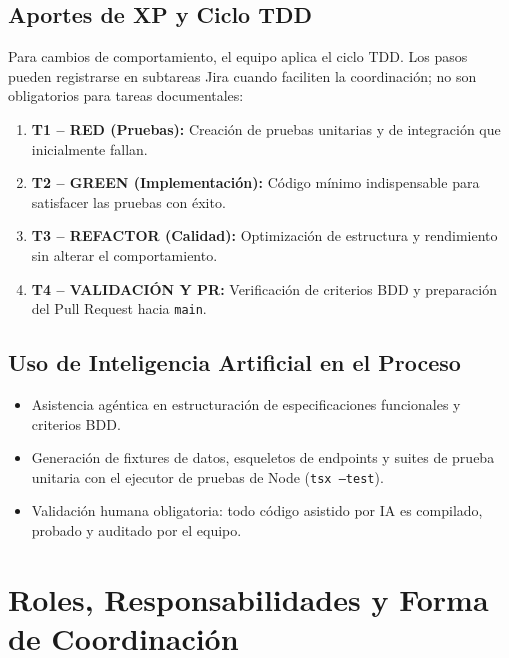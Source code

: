 \documentclass[11pt,a4paper]{article}
\begin{document}
\subsection{Aportes de XP y Ciclo TDD}
Para cambios de comportamiento, el equipo aplica el ciclo TDD. Los pasos pueden registrarse en subtareas Jira cuando faciliten la coordinación; no son obligatorios para tareas documentales:
\begin{enumerate}[leftmargin=*]
    \item \textbf{T1 -- RED (Pruebas):} Creación de pruebas unitarias y de integración que inicialmente fallan.
    \item \textbf{T2 -- GREEN (Implementación):} Código mínimo indispensable para satisfacer las pruebas con éxito.
    \item \textbf{T3 -- REFACTOR (Calidad):} Optimización de estructura y rendimiento sin alterar el comportamiento.
    \item \textbf{T4 -- VALIDACIÓN Y PR:} Verificación de criterios BDD y preparación del Pull Request hacia \texttt{main}.
\end{enumerate}

\subsection{Uso de Inteligencia Artificial en el Proceso}
\begin{itemize}[leftmargin=*]
    \item Asistencia agéntica en estructuración de especificaciones funcionales y criterios BDD.
    \item Generación de fixtures de datos, esqueletos de endpoints y suites de prueba unitaria con el ejecutor de pruebas de Node (\texttt{tsx --test}).
    \item Validación humana obligatoria: todo código asistido por IA es compilado, probado y auditado por el equipo.
\end{itemize}

\section{Roles, Responsabilidades y Forma de Coordinación}
\end{document}
